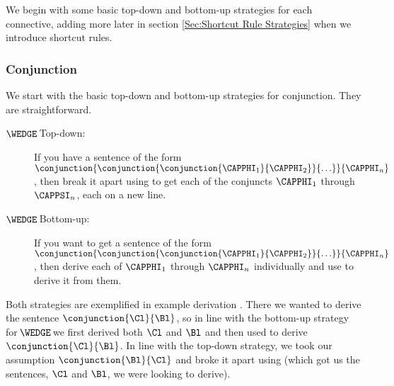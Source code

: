 We begin with some basic top-down and bottom-up strategies for each connective, adding more later in section \ref{Sec:Shortcut Rule Strategies} when we introduce shortcut rules.

\subsubsection*{Conjunction} 
We start with the basic top-down and bottom-up strategies for conjunction. They are straightforward.
\begin{description}
\item[$\WEDGE\!$ Top-down:] If you have a sentence of the form $\conjunction{\conjunction{\conjunction{\CAPPHI_1}{\CAPPHI_2}}{\ldots}}{\CAPPHI_n}$, then break it apart using  to get each of the conjuncts $\CAPPHI_1$ through $\CAPPSI_n$, each on a new line.
\item[$\WEDGE\!$ Bottom-up:] If you want to get a sentence of the form $\conjunction{\conjunction{\conjunction{\CAPPHI_1}{\CAPPHI_2}}{\ldots}}{\CAPPHI_n}$, then derive each of $\CAPPHI_1$ through $\CAPPHI_n$ individually and use  to derive it from them. 
\end{description} 
Both strategies are exemplified in example derivation . 
There we wanted to derive the sentence $\conjunction{\Cl}{\Bl}$, so in line with the bottom-up strategy for $\!\WEDGE\!$ we first derived both $\Cl$ and $\Bl$ and then used  to derive $\conjunction{\Cl}{\Bl}$. 
In line with the top-down strategy, we took our assumption $\conjunction{\Bl}{\Cl}$ and broke it apart using  (which got us the sentences, $\Cl$ and $\Bl$, we were looking to derive). 

